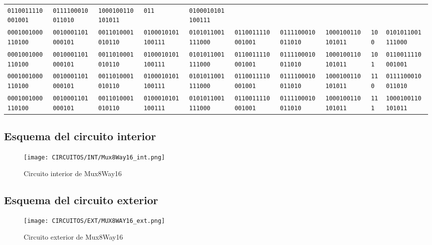 \documentclass[12pt]{article}
\begin{document}
\begin{table}[H]
{\begin{tabular}{@{}llllllllll@{}}
					\texttt{0110011110001001} &
					\texttt{0111100010011010} &
					\texttt{1000100110101011} &
					\texttt{011} &
					\texttt{0100010101100111} \\
					\texttt{0001001000110100} &
					\texttt{0010001101000101} &
					\texttt{0011010001010110} &
					\texttt{0100010101100111} &
					\texttt{0101011001111000} &
					\texttt{0110011110001001} &
					\texttt{0111100010011010} &
					\texttt{1000100110101011} &
					\texttt{100} &
					\texttt{0101011001111000} \\
					\texttt{0001001000110100} &
					\texttt{0010001101000101} &
					\texttt{0011010001010110} &
					\texttt{0100010101100111} &
					\texttt{0101011001111000} &
					\texttt{0110011110001001} &
					\texttt{0111100010011010} &
					\texttt{1000100110101011} &
					\texttt{101} &
					\texttt{0110011110001001} \\
					\texttt{0001001000110100} &
					\texttt{0010001101000101} &
					\texttt{0011010001010110} &
					\texttt{0100010101100111} &
					\texttt{0101011001111000} &
					\texttt{0110011110001001} &
					\texttt{0111100010011010} &
					\texttt{1000100110101011} &
					\texttt{110} &
					\texttt{0111100010011010} \\
					\texttt{0001001000110100} &
					\texttt{0010001101000101} &
					\texttt{0011010001010110} &
					\texttt{0100010101100111} &
					\texttt{0101011001111000} &
					\texttt{0110011110001001} &
					\texttt{0111100010011010} &
					\texttt{1000100110101011} &
					\texttt{111} &
					\texttt{1000100110101011} \\ \bottomrule
				\end{tabular}%
			}
		\end{table}

		\subsection{Esquema del circuito interior}
		\begin{figure}[H]
			\centering
			\texttt{[image: CIRCUITOS/INT/Mux8Way16\_int.png]}            \caption{Circuito interior de Mux8Way16 \cite{circuitverse}}
			\label{fig:mux8way16_int}
		\end{figure}
		\subsection{Esquema del circuito exterior}
		\begin{figure}[H]
			\centering
			\texttt{[image: CIRCUITOS/EXT/MUX8WAY16\_ext.png]}
			\caption{Circuito exterior de Mux8Way16 \cite{circuitverse}}
			\label{fig:mux8way16_ext}
		\end{figure}
\end{document}
